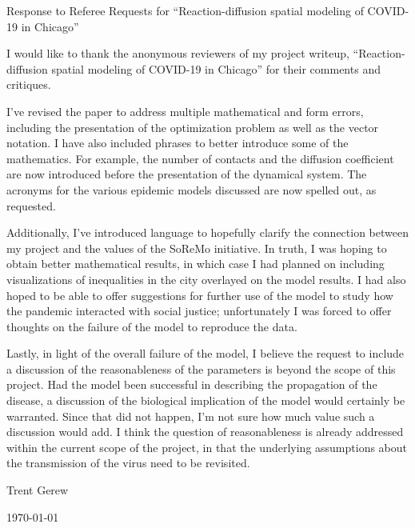 \documentclass[11pt,letterpaper]{article}
\begin{document}
	\vspace{1in}
	
	\begin{center}
		{\Large Response to Referee Requests for ``Reaction-diffusion spatial modeling of COVID-19 in Chicago''}
	\end{center}

	\vspace{0.25in}
		
	
	I would like to thank the anonymous reviewers of my project writeup, ``Reaction-diffusion spatial modeling of COVID-19 in Chicago'' for their comments and critiques.
	
	I've revised the paper to address multiple mathematical and form errors, including the presentation of the optimization problem as well as the vector notation.
	I have also included phrases to better introduce some of the mathematics.
	For example, the number of contacts and the diffusion coefficient are now introduced before the presentation of the dynamical system.
	The acronyms for the various epidemic models discussed are now spelled out, as requested.
	
	Additionally, I've introduced language to hopefully clarify the connection between my project and the values of the SoReMo initiative.
	In truth, I was hoping to obtain better mathematical results, in which case I had planned on including visualizations of inequalities in the city overlayed on the model results.
	I had also hoped to be able to offer suggestions for further use of the model to study how the pandemic interacted with social justice; unfortunately I was forced to offer thoughts on the failure of the model to reproduce the data.
	
	Lastly, in light of the overall failure of the model, I believe the request to include a discussion of the reasonableness of the parameters is beyond the scope of this project.
	Had the model been successful in describing the propagation of the disease, a discussion of the biological implication of the model would certainly be warranted.
	Since that did not happen, I'm not sure how much value such a discussion would add.
	I think the question of reasonableness is already addressed within the current scope of the project, in that the underlying assumptions about the transmission of the virus need to be revisited.
	
	\vspace{0.25in}
	
	\begin{FlushRight}
		Trent Gerew
		
		\today
	\end{FlushRight}
\end{document}
